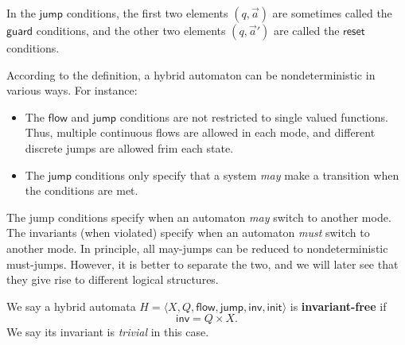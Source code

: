 \documentclass[envcountsect]{llncs}
\newcommand{\flow}{\mathsf{flow}}
\newcommand{\jump}{\mathsf{jump}}
\newcommand{\inv}{\mathsf{inv}}
\newcommand{\init}{\mathsf{init}}
\newcommand{\guard}{\mathsf{guard}}
\newcommand{\reset}{\mathsf{reset}}
\begin{document}

\begin{remark}[$\guard$ and $\reset$]
In the $\jump$ conditions, the first two elements $(q, \vec a)$ are sometimes called the $\guard$ conditions, and the other two elements $(q, \vec a')$ are called the $\reset$ conditions. 
\end{remark}

\begin{remark}[Nondeterminism]
According to the definition, a hybrid automaton can be nondeterministic in various ways. For instance: 
\begin{itemize}
\item The $\flow$ and $\jump$ conditions are not restricted to single valued functions. Thus, multiple continuous flows are allowed in each mode, and different discrete jumps are allowed frim each state. 
\item The $\jump$ conditions only specify that a system {\em may} make a transition when the conditions are met. 
\end{itemize}
\end{remark}

\begin{remark}[$\jump$ vs $\inv$] The jump conditions specify when an automaton {\em may} switch to another mode. The invariants (when violated) specify when an automaton {\em must} switch to another mode. In principle, all may-jumps can be reduced to nondeterministic must-jumps. However, it is better to separate the two, and we will later see that they give rise to different logical structures. 
\end{remark}

\begin{definition}
We say a hybrid automata $H = \langle X, Q, \flow, \jump, \inv, \init\rangle$ is {\bf invariant-free} if $$\inv = Q\times X.$$ 
We say its invariant is {\em trivial} in this case.  
\end{definition}
\end{document}

